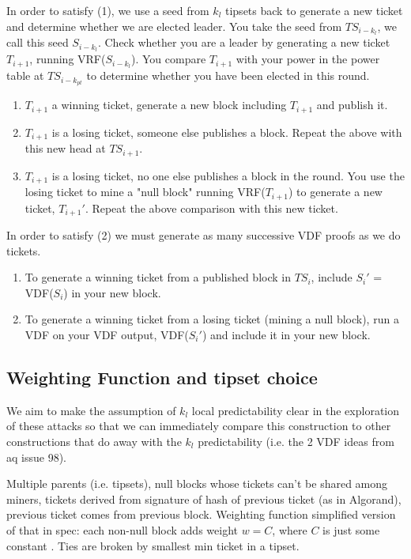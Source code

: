 \documentclass{article}
\begin{document}
In order to satisfy (1), we use a seed from $k_l$ tipsets back to generate a new ticket and determine whether we are elected leader.
You take the seed from $TS_{i-k_l}$, we call this seed $S_{i-k_l}$. Check whether you are a leader by generating a new ticket $T_{i+1}$, running VRF($S_{i-k_l}$).
You compare $T_{i+1}$ with your power in the power table at $TS_{i-k_{pt}}$ to determine whether you have been elected in this round.
\begin{enumerate}
\item $T_{i+1}$ a winning ticket, generate a new block including $T_{i+1}$ and publish it.
\item $T_{i+1}$ is a losing ticket, someone else publishes a block. Repeat the above with this new head at $TS_{i+1}$.
\item $T_{i+1}$ is a losing ticket, no one else publishes a block in the round. You use the losing ticket to mine a "null block" running VRF($T_{i+1}$) to generate a new ticket, $T_{i+1}'$. Repeat the above comparison with this new ticket.
\end{enumerate}

In order to satisfy (2) we must generate as many successive VDF proofs as we do tickets.
\begin{enumerate}
\item To generate a winning ticket from a published block in $TS_{i}$, include $S_i'$ = VDF($S_i$) in your new block.
\item To generate a winning ticket from a losing ticket (mining a null block), run a VDF on your VDF output, VDF($S_i'$) and include it in your new block.
\end{enumerate}

\subsection{Weighting Function and tipset choice}
We aim to make the assumption of $k_l$ local predictability clear in the exploration of these attacks so that we can immediately compare this construction to other constructions that do away with the $k_l$ predictability (i.e. the 2 VDF ideas from aq issue 98).

Multiple parents (i.e. tipsets), null blocks whose tickets can't be shared among miners, tickets derived from signature of hash of previous ticket (as in Algorand), previous ticket comes from previous block.  Weighting function simplified version of that in spec: each non-null block adds weight $w = C $, where $ C $ is just some constant .  Ties are broken by smallest min ticket in a tipset. 
\end{document}

